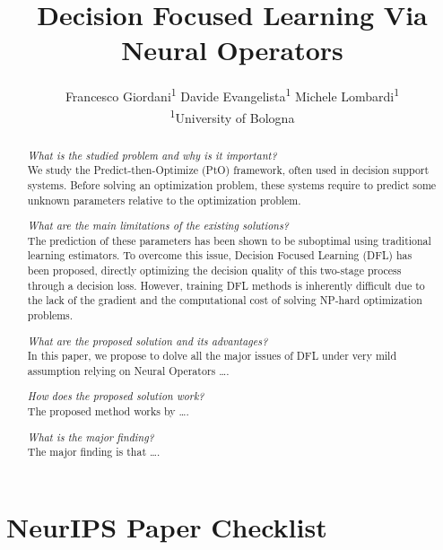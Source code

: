 \documentclass{article} %
\title{Decision Focused Learning Via Neural Operators} %
\author{%
  Francesco Giordani\textsuperscript{1} \quad 
  Davide Evangelista\textsuperscript{1} \quad 
  Michele Lombardi\textsuperscript{1} \\
  \textsuperscript{1}University of Bologna
}
\begin{document}
\maketitle

\begin{abstract}

\textit{What is the studied problem and why is it important?}\\
We study the Predict-then-Optimize (PtO) framework, often used in decision support systems. Before solving an optimization problem, these systems require to predict some unknown parameters relative to the optimization problem.

\textit{What are the main limitations of the existing solutions?}\\
The prediction of these parameters has been shown to be suboptimal using traditional learning estimators. 
To overcome this issue, Decision Focused Learning (DFL) has been proposed, directly optimizing the decision quality of this two-stage process through a decision loss. 
However, training DFL methods is inherently difficult due to the lack of the gradient and the computational cost of solving NP-hard optimization problems.

\textit{What are the proposed solution and its advantages?}\\
In this paper, we propose to dolve all the major issues of DFL under very mild assumption relying on Neural Operators \dots.

\textit{How does the proposed solution work?}\\
The proposed method works by \dots.

\textit{What is the major finding?}\\
The major finding is that \dots.

\end{abstract}








\begin{ack}
\end{ack}




\newpage
\section*{NeurIPS Paper Checklist}
\end{document}
